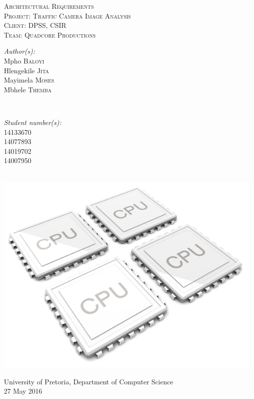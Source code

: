 \documentclass[a4paper,12pt]{article}
\begin{document}
\begin{titlepage}
\center

\textsc{\LARGE Architectural Requirements}\\[1.5cm]
\textsc{\Large Project: Traffic Camera Image Analysis}\\[1.5cm]
\textsc{\large Client: DPSS, CSIR}\\[0.5cm]
\textsc{\large Team: Quadcore Productions}\\[0.5cm]

\begin{minipage}{0.4\textwidth}
\begin{flushleft} \large
\emph{Author(s):}\\
Mpho \textsc{Baloyi}\\
Hlengekile \textsc{Jita}\\
Mayimela \textsc{Moses}\\
Mbhele \textsc{Themba}\\
\end{flushleft}
\end{minipage}
~
\begin{minipage}{0.4\textwidth}
\begin{flushright} \large
\emph{Student number(s):} \\
14133670\\ %
14077893\\
14019702\\
14007950\\
\end{flushright}
\end{minipage}\\

\includegraphics[width=\textwidth]{2012-quad-core-phones.jpg}

{\large University of Pretoria, Department of Computer Science}\\

{\large 27 May 2016}\\[3cm]

\vfil

\end{titlepage}
\end{document}
